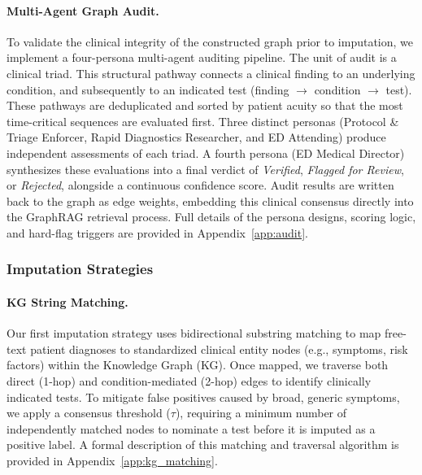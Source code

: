\documentclass[pmlr]{jmlr}%
\begin{document}
\paragraph{Multi-Agent Graph Audit.}
To validate the clinical integrity of the constructed graph prior to imputation, we implement a four-persona multi-agent auditing pipeline. The unit of audit is a clinical triad. This structural pathway connects a clinical finding to an underlying condition, and subsequently to an indicated test (finding $\rightarrow$ condition $\rightarrow$ test). These pathways are deduplicated and sorted by patient acuity so that the most time-critical sequences are evaluated first. Three distinct personas (Protocol \& Triage Enforcer, Rapid Diagnostics Researcher, and ED Attending) produce independent assessments of each triad. A fourth persona (ED Medical Director) synthesizes these evaluations into a final verdict of \textit{Verified}, \textit{Flagged for Review}, or \textit{Rejected}, alongside a continuous confidence score. Audit results are written back to the graph as edge weights, embedding this clinical consensus directly into the GraphRAG retrieval process. Full details of the persona designs, scoring logic, and hard-flag triggers are provided in Appendix~\ref{app:audit}.

\subsubsection{Imputation Strategies}
\paragraph{KG String Matching.}
Our first imputation strategy uses bidirectional substring matching to map free-text patient diagnoses to standardized clinical entity nodes (e.g., symptoms, risk factors) within the Knowledge Graph (KG). Once mapped, we traverse both direct (1-hop) and condition-mediated (2-hop) edges to identify clinically indicated tests. To mitigate false positives caused by broad, generic symptoms, we apply a consensus threshold ($\tau$), requiring a minimum number of independently matched nodes to nominate a test before it is imputed as a positive label. A formal description of this matching and traversal algorithm is provided in Appendix~\ref{app:kg_matching}.
\end{document}
